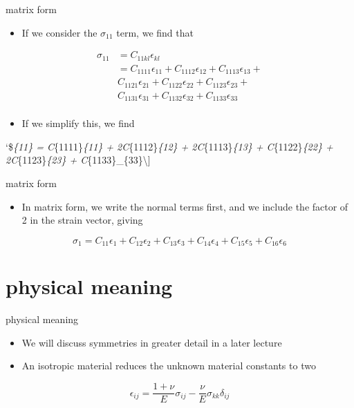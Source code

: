 \documentclass[
  letterpaper,
  ignorenonframetext,
  aspectratio=43,
  handout,
  12pt]{beamer}
\providecommand{\tightlist}{%
  \setlength{\itemsep}{0pt}\setlength{\parskip}{0pt}}
\providecommand{\tightlist}{%
\setlength{\itemsep}{0pt}\setlength{\parskip}{0pt}}
\begin{document}
\begin{frame}{matrix form}
\protect\hypertarget{matrix-form-2}{}
\begin{itemize}
\tightlist
\item
  If we consider the \(\sigma_{11}\) term, we find that
\end{itemize}

\[\begin{aligned}
    \sigma_{11} &= C_{11kl} \epsilon_{kl}\\
    &= C_{1111} \epsilon_{11} + C_{1112} \epsilon_{12} + C_{1113} \epsilon_{13} + \\
    &C_{1121} \epsilon_{21} + C_{1122} \epsilon_{22} + C_{1123} \epsilon_{23} + \\
    &C_{1131} \epsilon_{31} + C_{1132} \epsilon_{32} + C_{1133} \epsilon_{33} \\
\end{aligned}\]

\begin{itemize}
\tightlist
\item
  If we simplify this, we find
\end{itemize}

`\$\sigma\emph{\{11\} = C}\{1111\}\epsilon\emph{\{11\} +
2C}\{1112\}\epsilon\emph{\{12\} + 2C}\{1113\}\epsilon\emph{\{13\} +
C}\{1122\}\epsilon\emph{\{22\} + 2C}\{1123\}\epsilon\emph{\{23\} +
C}\{1133\}\epsilon\_\{33\}\textbackslash{]}
\end{frame}

\begin{frame}{matrix form}
\protect\hypertarget{matrix-form-3}{}
\begin{itemize}
\tightlist
\item
  In matrix form, we write the normal terms first, and we include the
  factor of 2 in the strain vector, giving
\end{itemize}

\[\sigma_1 = C_{11} \epsilon_1 + C_{12} \epsilon_2 + C_{13} \epsilon_3 + C_{14} \epsilon_4 + C_{15} \epsilon_5 + C_{16} \epsilon_6 \]
\end{frame}

\hypertarget{physical-meaning}{%
\section{physical meaning}\label{physical-meaning}}

\begin{frame}{physical meaning}
\protect\hypertarget{physical-meaning-1}{}
\begin{itemize}
\tightlist
\item
  We will discuss symmetries in greater detail in a later lecture
\item
  An isotropic material reduces the unknown material constants to two
\end{itemize}

\[\epsilon_{ij} = \frac{1+\nu}{E}\sigma_{ij} - \frac{\nu}{E}\sigma_{kk} \delta_{ij}\]
\end{frame}
\end{document}
